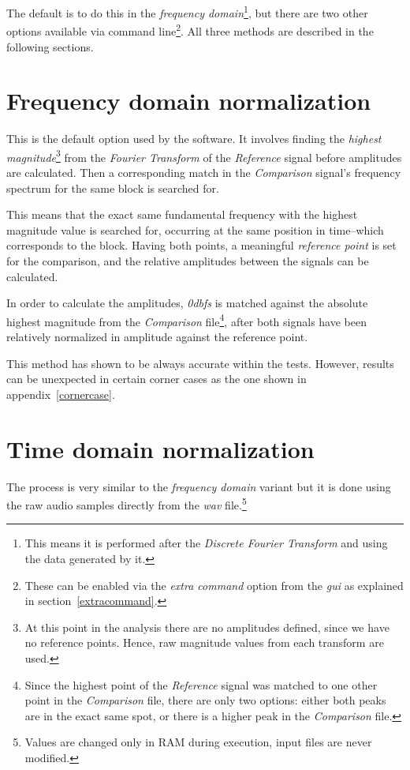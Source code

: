 \documentclass[10pt,a4paper]{report}
\newcommand{\ac}[1]{\textit{\mbox{\acrshort{#1}}}}
\newcommand{\db}[1]{\textit{\mbox{#1\acrshort{dbfs}}}}
\begin{document}
\begin{appendices}
The default is to do this in the \textit{frequency domain}\footnote{This means it is performed after the \textit{Discrete Fourier Transform} and using the data generated by it.}, but there are two other options available via command line\footnote{These can be enabled via the \textit{extra command} option from the \ac{gui} as explained in section~\ref{extracommand}.}. All three methods are described in the following sections.

\section{Frequency domain normalization}

This is the default option used by the software. It involves finding the \textit{highest magnitude}\footnote{At this point in the analysis there are no amplitudes defined, since we have no reference points. Hence, raw magnitude values from each transform are used.} from the \textit{Fourier Transform} of the \textit{Reference} signal before amplitudes are calculated. Then a corresponding match in the \textit{Comparison} signal's frequency spectrum for the same block is searched for. 

This means that the exact same fundamental frequency with the highest magnitude value is searched for, occurring at the same position in time--which corresponds to the block. Having both points, a meaningful \textit{reference point} is set for the comparison, and the relative amplitudes between the signals can be calculated.

In order to calculate the amplitudes, \db{0} is matched against the absolute highest magnitude from the \textit{Comparison} file\footnote{Since the highest point of the \textit{Reference} signal was matched to one other point in the \textit{Comparison} file, there are only two options: either both peaks are in the exact same spot, or there is a higher peak in the \textit{Comparison} file.}, after both signals have been relatively normalized in amplitude against the reference point.

This method has shown to be always accurate within the tests. However, results can be unexpected in certain corner cases as the one shown in appendix~\ref{cornercase}. 

\section{Time domain normalization}

The process is very similar to the \textit{frequency domain} variant but it is done using the raw audio samples directly from the \ac{wav} file.\footnote{Values are changed only in RAM during execution, input files are never modified.}


\end{appendices}
\end{document}
